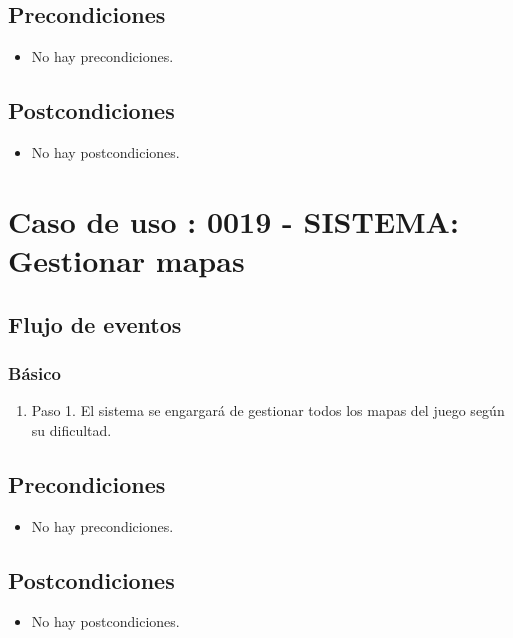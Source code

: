 \subsection{Precondiciones}
\begin{itemize}
\item No hay precondiciones.
\end{itemize}

\subsection{Postcondiciones}
\begin{itemize}
\item No hay postcondiciones.
\end{itemize}



\section{Caso de uso : 0019 - SISTEMA: Gestionar mapas}\label{sec:uc0}
\subsection{Flujo de eventos}
\subsubsection{Básico}

\begin{enumerate}
\item Paso 1.
El sistema se engargará de gestionar todos los mapas del juego según su dificultad.
\end{enumerate}

\subsection{Precondiciones}
\begin{itemize}
\item No hay precondiciones.
\end{itemize}

\subsection{Postcondiciones}
\begin{itemize}
\item No hay postcondiciones.
\end{itemize}



